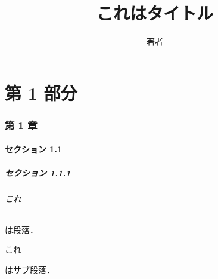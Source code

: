 \documentclass{jarticle}
\title{これはタイトル}
\author{著者}
\begin{document}
\maketitle
\tableofcontents
\clearpage
\part{第 1 部分}
\section{第 1 章}
\subsection{セクション 1.1}
\subsubsection{セクション 1.1.1}
\paragraph{これ} は段落．
\subparagraph{これ} はサブ段落．
\end{document}
